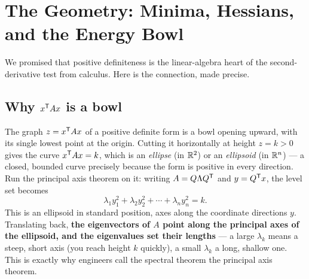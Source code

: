 \section{The Geometry: Minima, Hessians, and the Energy Bowl}

We promised that positive definiteness is the linear-algebra heart of the second-derivative test from calculus. Here is the connection, made precise.

\subsection{Why $x^{\mathsf T} Ax$ is a bowl}

The graph $z=x^{\mathsf T} Ax$ of a positive definite form is a bowl opening upward, with its single lowest point at the origin. Cutting it horizontally at height $z=k>0$ gives the curve $x^{\mathsf T} Ax=k$, which is an \emph{ellipse} (in $\mathbb{R}^2$) or an \emph{ellipsoid} (in $\mathbb{R}^n$) --- a closed, bounded curve precisely because the form is positive in every direction. Run the principal axis theorem on it: writing $A=Q\Lambda Q^{\mathsf T}$ and $y=Q^{\mathsf T} x$, the level set becomes
\[
   \lambda_1 y_1^2+\lambda_2 y_2^2+\cdots+\lambda_n y_n^2=k .
\]
This is an ellipsoid in standard position, axes along the coordinate directions $y$. Translating back, \textbf{the eigenvectors of $A$ point along the principal axes of the ellipsoid, and the eigenvalues set their lengths} --- a large $\lambda_k$ means a steep, short axis (you reach height $k$ quickly), a small $\lambda_k$ a long, shallow one. This is exactly why engineers call the spectral theorem the principal axis theorem.

\begin{center}
\end{center}

